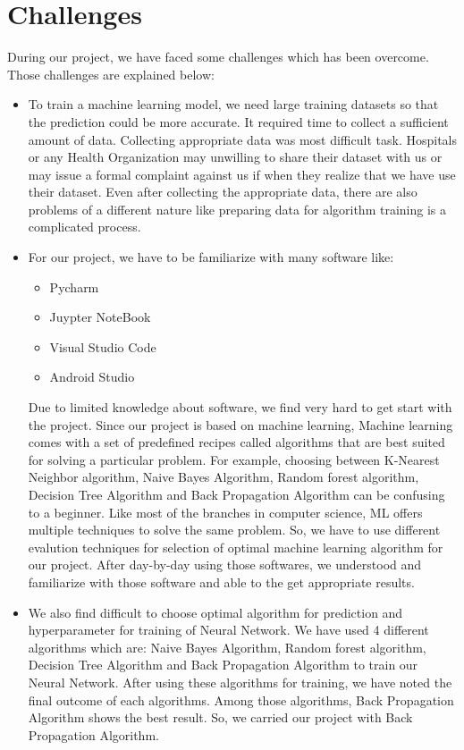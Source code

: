 {\section{Challenges}
During our project, we have faced some challenges which has been overcome. Those challenges are explained below:
\begin{itemize}
    \item To train a machine learning model, we need large training datasets so that the prediction could be more accurate. It required time to collect a sufficient amount of data. Collecting appropriate data was most difficult task. Hospitals or any Health Organization may unwilling to share their dataset with us or may issue a formal complaint against us if when they realize that we have use their dataset. Even after collecting the appropriate data, there are also problems of a different nature like preparing data for algorithm training is a complicated process.
    \item  For our project, we have to be familiarize with many software like: 
    \begin{itemize}
        \item Pycharm
        \item Juypter NoteBook 
        \item Visual Studio Code 
        \item Android Studio
    \end{itemize}
     Due to limited knowledge about software, we find very hard to get start with the project. Since our project is based on machine learning, Machine learning comes with a set of predefined recipes called algorithms that are best suited for solving a particular problem.
For example, choosing between K-Nearest Neighbor algorithm, Naive Bayes Algorithm, Random forest algorithm, Decision Tree Algorithm and Back Propagation Algorithm can be confusing to a beginner. Like most of the branches in computer science, ML offers multiple techniques to solve the same problem. So, we have to use different evalution techniques for selection of optimal machine learning algorithm for our project. After day-by-day using those softwares, we understood and familiarize with those software and able to the get appropriate results.  
    \item  We also find difficult to choose optimal algorithm for prediction and hyperparameter for training of Neural Network. We have used 4 different algorithms which are: Naive Bayes Algorithm, Random forest algorithm, Decision Tree Algorithm and Back Propagation Algorithm to train our Neural Network. After using these algorithms for training, we have noted the final outcome of each algorithms. Among those algorithms, Back Propagation Algorithm shows the best result. So, we carried our project with Back Propagation Algorithm.
\end{itemize}

}
